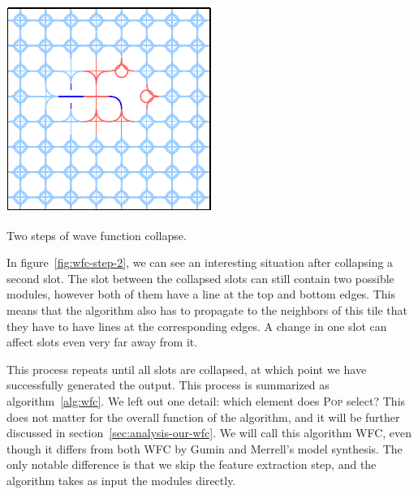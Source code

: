 \begin{center}
\begin{minipage}{.31\textwidth}
         \label{fig:wfc-step-1}
    \end{minipage}%
    \begin{minipage}{.31\textwidth}
        \centering
        \includegraphics[width=0.95\linewidth]{img/WFC step 2.pdf}
         \label{fig:wfc-step-2}
    \end{minipage}
    \caption{Two steps of wave function collapse.}
    \label{fig:wfc-steps}
\end{center}

In figure~\ref{fig:wfc-step-2}, we can see an interesting situation after collapsing a second slot.
The slot between the collapsed slots can still contain two possible modules, however both of them have a line at the top and bottom edges.
This means that the algorithm also has to propagate to the neighbors of this tile that they have to have lines at the corresponding edges.
A change in one slot can affect slots even very far away from it.

This process repeats until all slots are collapsed, at which point we have successfully generated the output.
This process is summarized as algorithm~\ref{alg:wfc}.
We left out one detail: which element does \textsc{Pop} select?
This does not matter for the overall function of the algorithm, and it will be further discussed in section~\ref{sec:analysis-our-wfc}.
We will call this algorithm WFC, even though it differs from both WFC by Gumin and Merrell's model synthesis.
The only notable difference is that we skip the feature extraction step, and the algorithm takes as input the modules directly.

